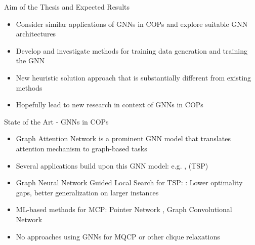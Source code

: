 \documentclass{beamer}
\begin{document}
\begin{frame}{Aim of the Thesis and Expected Results}
    \begin{itemize}
        \item<1-> Consider similar applications of GNNs in COPs and explore suitable GNN architectures
        \item<2-> Develop and investigate methods for training data generation and training the GNN
        \item<3-> New heuristic solution approach that is substantially different from existing methods
        \item<4-> Hopefully lead to new research in context of GNNs in COPs
    \end{itemize}
\end{frame}

\begin{frame}{State of the Art - GNNs in COPs}
    \begin{itemize}
        \item<1-> Graph Attention Network \cite{Velickovic2018} is a prominent GNN model that translates attention mechanism \cite{Bahdanau2015} to graph-based tasks
        \item<2-> Several applications build upon this GNN model: e.g. \cite{Kool2019}, \cite{Joshi2021} (TSP)
        \item<3-> Graph Neural Network Guided Local Search for TSP: \cite{Hudson2021}: Lower optimality gaps, better generalization on larger instances
        \item<4-> ML-based methods for MCP: Pointer Network \cite{Gu2020}, Graph Convolutional Network \cite{Li2018}
        \item<5-> No approaches using GNNs for MQCP or other clique relaxations
    \end{itemize}
\end{frame}
\end{document}
